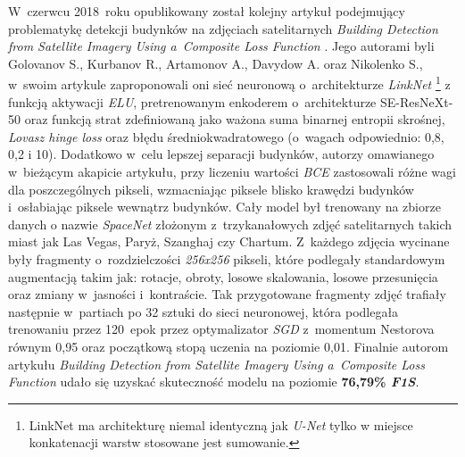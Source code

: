 W~czerwcu 2018~roku opublikowany został kolejny artykuł podejmujący problematykę detekcji budynków na zdjęciach satelitarnych \emph{Building Detection from Satellite Imagery Using a~Composite Loss Function} \cite{golovanov}. Jego autorami byli Golovanov S., Kurbanov R., Artamonov A., Davydow A. oraz Nikolenko S., w~swoim artykule zaproponowali oni sieć neuronową o~architekturze \emph{LinkNet} \footnote{LinkNet ma architekturę niemal identyczną jak \emph{U-Net} tylko w miejsce konkatenacji warstw stosowane jest sumowanie.} z funkcją aktywacji \emph{ELU}, pretrenowanym enkoderem o~architekturze SE-ResNeXt-50 oraz funkcją strat zdefiniowaną jako ważona suma binarnej entropii skrośnej, \emph{Lovasz hinge loss} oraz błędu średniokwadratowego (o~wagach odpowiednio: 0,8, 0,2 i 10). Dodatkowo w~celu lepszej separacji budynków, autorzy omawianego w~bieżącym akapicie artykułu, przy liczeniu wartości \emph{BCE} zastosowali różne wagi dla poszczególnych pikseli, wzmacniając piksele blisko krawędzi budynków i~osłabiając piksele wewnątrz budynków. Cały model był trenowany na zbiorze danych o nazwie \emph{SpaceNet} złożonym z~trzykanałowych zdjęć satelitarnych takich miast jak Las Vegas, Paryż, Szanghaj czy Chartum. Z~każdego zdjęcia wycinane były fragmenty o~rozdzielczości \emph{256x256} pikseli, które podlegały standardowym augmentacją takim jak: rotacje, obroty, losowe skalowania, losowe przesunięcia oraz zmiany w~jasności i~kontraście. Tak przygotowane fragmenty zdjęć trafiały następnie w~partiach po 32 sztuki do sieci neuronowej, która podlegała trenowaniu przez 120~epok przez optymalizator \emph{SGD} z~momentum Nestorova równym 0,95 oraz początkową stopą uczenia na poziomie 0,01. Finalnie autorom artykułu \emph{Building Detection from Satellite Imagery Using a~Composite Loss Function} udało się uzyskać skuteczność modelu na poziomie \textbf{76,79\% \emph{F1S}}. 

